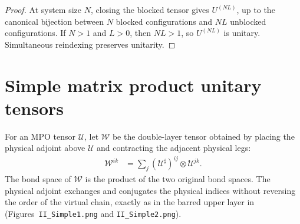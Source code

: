 \begin{proof}\leanok
    At system size $N$, closing the blocked tensor gives $U^{(NL)}$, up to the
    canonical bijection between $N$ blocked configurations and $NL$ unblocked
    configurations.  If $N>1$ and $L>0$, then $NL>1$, so $U^{(NL)}$ is
    unitary.  Simultaneous reindexing preserves unitarity.
\end{proof}

\section{Simple matrix product unitary tensors}

\begin{definition}
    \label{def:mpu_double_layer}
    \leanok
    For an MPO tensor $\mathcal U$, let $\mathcal W$ be the double-layer
    tensor obtained by placing the physical adjoint above $\mathcal U$ and
    contracting the adjacent physical legs:
    \begin{align}
        \mathcal W^{ik}
         & =\sum_j (\mathcal U^\sharp)^{ij}\otimes\mathcal U^{jk}.
    \end{align}
    The bond space of $\mathcal W$ is the product of the two original bond
    spaces.  The physical adjoint exchanges and conjugates the physical
    indices without reversing the order of the virtual chain, exactly as in
    the barred upper layer in \cite{Cirac2017MPU} (Figures~\texttt{II\_Simple1.png} and
    \texttt{II\_Simple2.png}).
\end{definition}

